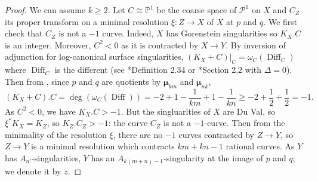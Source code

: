 \documentclass{amsart}
\newcommand{\bP}{\mathbb{P}}
\newcommand{\cP}{\mathcal{P}}
\newcommand{\bmu}{\bm{\mu}}
\theoremstyle{definition}
\begin{document}
\begin{proof}
We can assume $k\ge 2$. Let $C\cong \bP^1$ be the coarse space of $\cP^1$ on $X$ and $C_{Z}$ its proper transform on a minimal resolution $\xi:Z\to X$ of $X$ at $p$ and $q$. We first check that $C_Z$ is not a $-1$ curve. Indeed, $X$ has Gorenstein singularities so $K_X.C$ is an integer. Moreover, $C^2<0$ as it is contracted by $X\to Y$. By inversion of adjunction for log-canonical surface singularities, $(K_X+C)|_C = \omega_C(\operatorname{Diff}_C)$ where $\operatorname{Diff}_C$ is the different (see \cite{Kollarsingmmp}*{Definition 2.34} or \cite{BI}*{Section 2.2} with $\Delta=0$). Then from \cite[Corollary 4.9 and Lemma 4.11 (1)]{BI}, since $p$ and $q$ are quotients by $\bmu_{km}$ and $\bmu_{nk}$, $$(K_X+C).C = \deg(\omega_C(\operatorname{Diff})) =  -2 + 1- \frac{1}{km}   + 1-\frac{1}{kn}\ge -2 + \frac{1}{2} +\frac{1}{2} = -1. $$
As $C^2<0$, we have $K_X.C > -1$. But the singluarlties of $X$ are Du Val, so $\xi^*K_X = K_Z$, so $K_Z.C_Z>-1$: the curve $C_Z$ is not a $-1$-curve. Then from the minimality of the resolution $\xi$, there are no $-1$ curves contracted by $Z\to Y$, so $Z\to Y$ is a minimal resolution which contracts $km +kn - 1$ rational curves. As $Y$ has $A_{n'}$-singularities, $Y$ has an $A_{k(m+n)-1}$-singularity at the image of $p$ and $q$; we denote it by $z$. 
 

\end{proof}
\end{document}
